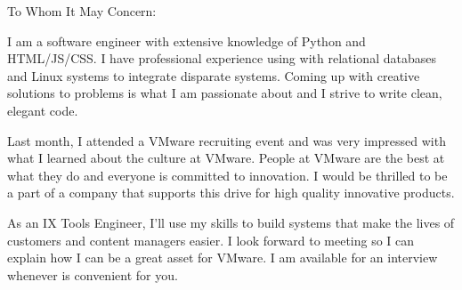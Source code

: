 

\opening{To Whom It May Concern:} 
I am a software engineer with extensive knowledge of Python and HTML/JS/CSS. I have professional experience using with relational databases and Linux systems to integrate disparate systems. Coming up with creative solutions to problems is what I am passionate about and I strive to write clean, elegant code. 
    
    Last month, I attended a VMware recruiting event and was very impressed with what I learned about the culture at VMware. People at VMware are the best at what they do and everyone is committed to innovation. I would be thrilled to be a part of a company that supports this drive for high quality innovative products. 
    
    As an IX Tools Engineer, I'll use my skills to build systems that make the lives of customers and content managers easier. I look forward to meeting so I can explain how I can be a great asset for VMware. I am available for an interview whenever is convenient for you. 
